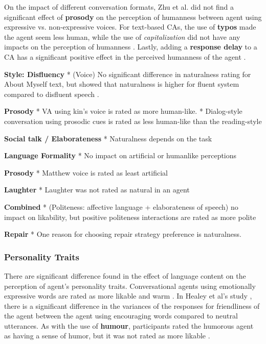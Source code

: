 On the impact of different conversation formats, Zhu et al. did not find a significant effect of \textbf{prosody} on the perception of humanness between agent using expressive vs. non-expressive voices. For text-based CAs, the use of \textbf{typos} made the agent seem less human, while the use of \textit{capitalization} did not have any impacts on the perception of humanness \cite{westerman2019believe}\cmt{[9]}. Lastly, adding a \textbf{response delay} to a CA has a significant positive effect in the perceived humanness of the agent \cite{gnewuch2018faster}\cmt{[19]}. 


\textbf{Style: Disfluency}
* (Voice) No significant difference in naturalness rating for About Myself text, but showed that naturalness is higher for fluent system compared to disfluent speech \cite{wester2015artificial}\cmt{[14]}.

\textbf{Prosody}
* VA using kin's voice is rated as more human-like. \cite{chan2021kinvoices}\cmt{[74]}
* Dialog-style conversation using prosodic cues is rated as less human-like than the reading-style \cite{misu2011toward}\cmt{[83]}

\textbf{Social talk / Elaborateness}
* Naturalness depends on the task \cite{haas2022keep}\cmt{[78]}

\textbf{Language Formality}
* No impact on artificial or humanlike perceptions \cite{jestin2022effects}\cmt{[81]}

\textbf{Prosody}
* Matthew voice is rated as least artificial  \cite{jestin2022effects}\cmt{[81]}

\textbf{Laughter}
* Laughter was not rated as natural in an agent \cite{niewiadomski2013laugh}\cmt{[85]}

\textbf{Combined}
* (Politeness: affective language + elaborateness of speech) no impact on likability, but positive politeness interactions are rated as more polite \cite{hu2022polite}\cmt{[76]}

\textbf{Repair}
* One reason for choosing repair strategy preference is naturalness. \cite{ashktorab2019resilient}\cmt{[88]}


\subsubsection{Personality Traits}

There are significant difference found in the effect of language content on the perception of agent's personality traits. Conversational agents using emotionally expressive words are rated as more likable \cite{zhu2022effects}\cmt{[26]} and warm \cite{lee2019s}\cmt{[55]}. In Healey et al's study \cite{healey2013relating}\cmt{[39]}, there is a significant difference in the variances of the responses for friendliness of the agent between the agent using encouraging words compared to neutral utterances. As with the use of \textbf{humour}, participants rated the humorous agent as having a sense of humor, but it was not rated as more likable \cite{ceha2021can}\cmt{[57]}.

